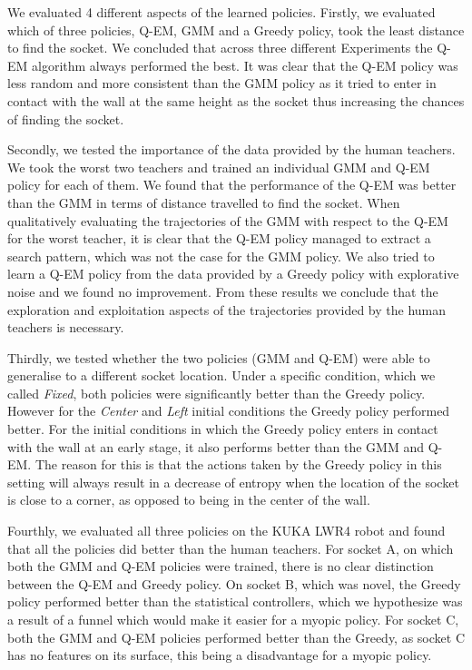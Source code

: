 \documentclass[final,3p,times,twocolumn]{elsarticle}
\begin{document}
We evaluated 4 different aspects of the learned policies. Firstly, we evaluated which of three policies, Q-EM, GMM and a Greedy policy, 
took the least distance to find the socket. We concluded that across three different Experiments the Q-EM algorithm always performed
the best. It was clear that the Q-EM policy was less random and more consistent than the GMM policy as it tried to enter in 
contact with the wall at the same height as the socket thus increasing the chances of finding the socket.

Secondly, we tested the importance of the data provided by the human teachers. We took the worst two teachers and trained an
individual GMM and Q-EM policy for each of them. We found that the performance of the Q-EM was better than the GMM in terms 
of distance travelled to find the socket. When qualitatively evaluating the trajectories of the GMM with respect to the 
Q-EM for the worst teacher, it is clear that the Q-EM policy managed to extract a search pattern, which was not the case 
for the GMM policy. We also tried to learn a Q-EM policy from the data provided by a Greedy policy with explorative noise 
and we found no improvement. From these results we conclude that the exploration and exploitation aspects of the trajectories 
provided by the human teachers is necessary.

Thirdly, we tested whether the two policies (GMM and Q-EM) were able to generalise to a different socket location. Under a specific condition,
which we called \textit{Fixed}, both policies were significantly better than the Greedy policy. However for the \textit{Center}
and \textit{Left} initial conditions the Greedy policy performed better. For the initial conditions in which the Greedy policy 
enters in contact with the wall at an early stage, it also performs better than the GMM and Q-EM. The reason for this is that  
the actions taken by the Greedy policy in this setting will always result in a decrease of entropy when the location
of the socket is close to a corner, as opposed to being in the center of the wall.

Fourthly, we evaluated all three policies on the KUKA LWR4 robot and found that all the policies did better than the human 
teachers. For socket A, on which both the GMM and Q-EM policies were trained, there is no clear distinction between 
the Q-EM and Greedy policy. On socket B, which was novel, the Greedy policy performed better than the statistical controllers, 
which we hypothesize was a result of a funnel which would make it easier for a myopic policy. For socket C, both the 
GMM and Q-EM policies performed better than the Greedy, as socket C has no features on its surface, this being a disadvantage 
for a myopic policy.
\end{document}
